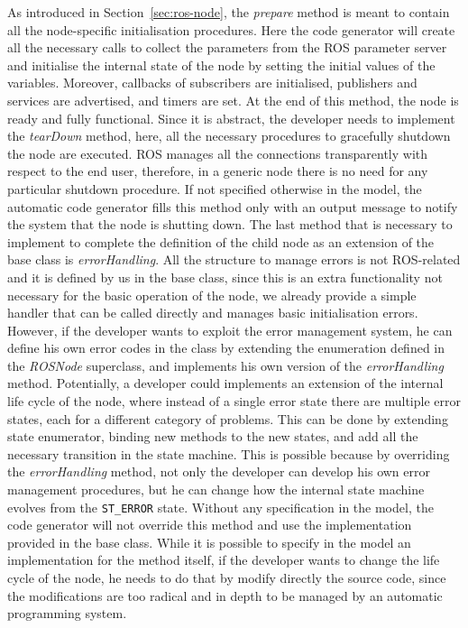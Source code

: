 As introduced in Section~\ref{sec:ros-node}, the \textit{prepare} method is meant to contain all the node-specific initialisation procedures. Here the code generator will create all the necessary calls to collect the parameters from the ROS parameter server and initialise the internal state of the node by setting the initial values of the variables. Moreover, callbacks of subscribers are initialised, publishers and services are advertised, and timers are set. At the end of this method, the node is ready and fully functional. Since it is abstract, the developer needs to implement the \textit{tearDown} method, here, all the necessary procedures to gracefully shutdown the node are executed. ROS manages all the connections transparently with respect to the end user, therefore, in a generic node there is no need for any particular shutdown procedure. If not specified otherwise in the model, the automatic code generator fills this method only with an output message to notify the system that the node is shutting down.  The last method that is necessary to implement to complete the definition of the child node as an extension of the base class is \textit{errorHandling}. All the structure to manage errors is not ROS-related and it is defined by us in the base class, since this is an extra functionality not necessary for the basic operation of the node, we already provide a simple handler that can be called directly and manages basic initialisation errors. However, if the developer wants to exploit the error management system, he can define his own error codes in the class by extending the enumeration defined in the \textit{ROSNode} superclass, and implements his own version of the \textit{errorHandling} method. Potentially, a developer could implements an extension of the internal life cycle of the node, where instead of a single error state there are multiple error states, each for a different category of problems. This can be done by extending state enumerator, binding new methods to the new states, and add all the necessary transition in the state machine. This is possible because by overriding the \textit{errorHandling} method, not only the developer can develop his own error management procedures, but he can change how the internal state machine evolves from the \texttt{ST\_ERROR} state. Without any specification in the model, the code generator will not override this method and use the implementation provided in the base class. While it is possible to specify in the model an implementation for the method itself, if the developer wants to change the life cycle of the node, he needs to do that by modify directly the source code, since the modifications are too radical and in depth to be managed by an automatic programming system.


